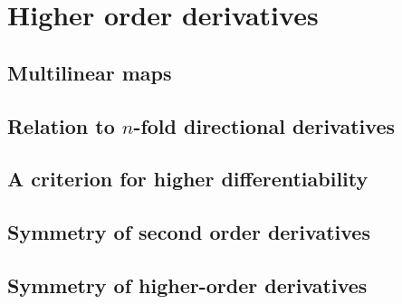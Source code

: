 \section{Higher order derivatives}

\subsection{Multilinear maps}

\subsection{Relation to \texorpdfstring{$n$}{n}-fold directional derivatives}

\subsection{A criterion for higher differentiability}

\subsection{Symmetry of second order derivatives}

\subsection{Symmetry of higher-order derivatives}

